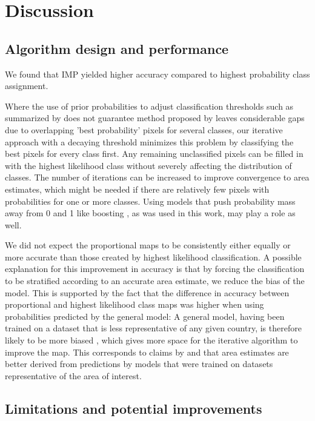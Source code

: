 \section{Discussion}

    \subsection{Algorithm design and performance}

        We found that IMP yielded higher accuracy compared to highest probability class assignment. 
    
        Where the use of prior probabilities to adjust classification thresholds such as summarized by \citet{mingguo2009effect} does not guarantee  method proposed by \citep{horvath2021comparison} leaves considerable gaps due to overlapping 'best probability' pixels for several classes, our iterative approach with a decaying threshold minimizes this problem by classifying the best pixels for every class first. Any remaining unclassified pixels can be filled in with the highest likelihood class without severely affecting the distribution of classes. The number of iterations can be increased to improve convergence to area estimates, which might be needed if there are relatively few pixels with probabilities for one or more classes. Using models that push probability mass away from 0 and 1 like boosting \citep{niculescu2005predicting}, as was used in this work, may play a role as well.
    
        We did not expect the proportional maps to be consistently either equally or more accurate than those created by highest likelihood classification. A possible explanation for this improvement in accuracy is that by forcing the classification to be stratified according to an accurate area estimate, we reduce the bias of the model. This is supported by the fact that the difference in accuracy between proportional and highest likelihood class maps was higher when using probabilities predicted by the general model: A general model, having been trained on a dataset that is less representative of any given country, is therefore likely to be more biased \citep{he2009learning}, which gives more space for the iterative algorithm to improve the map. This corresponds to claims by \citet{sales2022land} and \citet{kleinewillinghofer2022unbiased} that area estimates are better derived from predictions by models that were trained on datasets representative of the area of interest.

    \subsection{Limitations and potential improvements}

